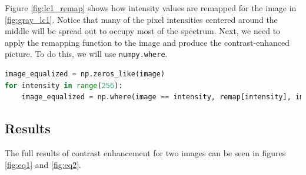 \documentclass[11pt,a4paper]{article}
\begin{document}
Figure \ref{fig:lc1_remap} shows how intensity values are remapped for the image in \ref{fig:gray_lc1}. Notice that many of the pixel intensities centered around the middle will be spread out to occupy most of the spectrum.
Next, we need to apply the remapping function to the image and produce the contrast-enhanced picture. To do this, we will use \verb|numpy.where|.

\begin{lstlisting}[language=Python]
image_equalized = np.zeros_like(image)
for intensity in range(256):
    image_equalized = np.where(image == intensity, remap[intensity], image_equalized)
\end{lstlisting}

\pagebreak

\subsection{Results}
The full results of contrast enhancement for two images can be seen in figures \ref{fig:eq1} and \ref{fig:eq2}.
\end{document}
